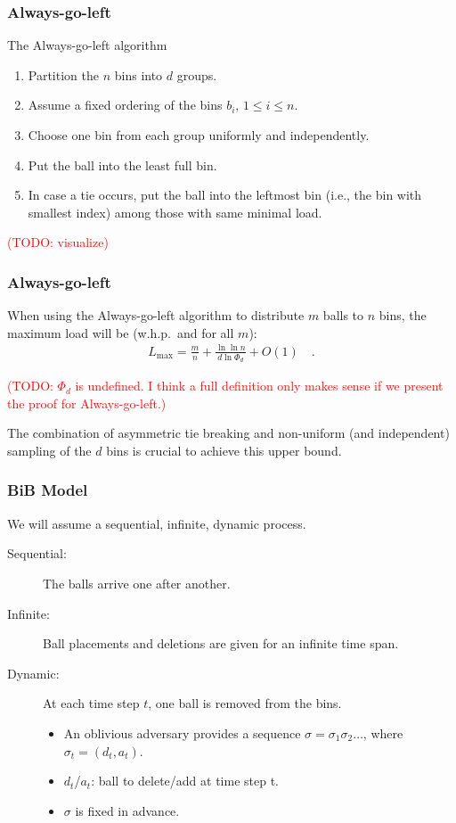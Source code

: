\documentclass[serif,professionalfonts]{beamer}
\newcommand\todo[1]{\textcolor{red}{(TODO: #1)}}
\newcommand\load{L_{\mathrm{max}}}
\newcounter{index}
\begin{document}
\begin{frame}
\frametitle{Always-go-left}
\begin{exampleblock}{The Always-go-left algorithm}
\begin{enumerate}
\item Partition the $n$ bins into $d$ groups.
\item Assume a fixed ordering of the bins $b_i$, $1\leq i \leq n$.
\item Choose one bin from each group uniformly and independently.
\item Put the ball into the least full bin.
\item In case a tie occurs, put the ball into the leftmost bin (i.e., the bin with smallest index) among those with same minimal load.
\end{enumerate}
\end{exampleblock}
\todo{visualize}
\end{frame}

\begin{frame}
\frametitle{Always-go-left}
\begin{theorem}[V\"ocking, 2003]
When using the \alert{Always-go-left} algorithm to distribute $m$ balls to $n$ bins, the maximum load will be  (w.h.p.~and for all $m$): 
\begin{align*}
\load = \frac{m}{n} + \frac{\ln \ln n}{d \ln \Phi_d} + O(1) \quad .
\end{align*}
\end{theorem}
\todo{$\Phi_d$ is undefined. I think a full definition only makes sense if we present the proof for Always-go-left.}

\bigskip
The combination of \alert{asymmetric tie breaking} and \alert{non-uniform} (and independent) sampling of the $d$ bins is crucial to achieve this upper bound.
\end{frame}

\begin{frame}
\frametitle{BiB Model}
We will assume a sequential, infinite, dynamic process.

\begin{description}
\item[\alert{Sequential:}] The balls arrive one after another.
\item[\alert{Infinite:}] Ball placements and deletions are given for an infinite time span.
\item[\alert{Dynamic:}] At each time step $t$, one ball is removed from the bins.
\begin{itemize}
\item An oblivious adversary provides a sequence $\sigma = \sigma_1 \sigma_2 \dots$, where $\sigma_t = (d_t, a_t)$.
\item $d_t$/$a_t$: ball to delete/add at time step t. \\
\item $\sigma$ is fixed in advance.
\end{itemize}
\end{description}
\end{frame}
\end{document}
